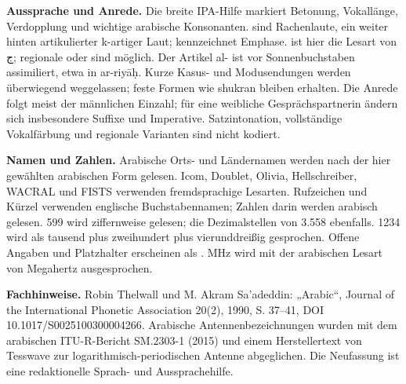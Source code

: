 \documentclass[a4paper,landscape,10pt]{article}
\newcommand{\ipa}[1]{{\ipafont[#1]}}
\begin{document}
\smallskip
\textbf{Aussprache und Anrede.} Die breite IPA-Hilfe markiert Betonung, Vokallänge, Verdopplung und wichtige
arabische Konsonanten. \ipa{ʕ, ħ} sind Rachenlaute, \ipa{q} ein weiter hinten artikulierter k-artiger Laut;
\ipa{ˤ} kennzeichnet Emphase. \ipa{dʒ} ist hier die Lesart von ج; regionale \ipa{ʒ} oder \ipa{ɡ} sind möglich.
Der Artikel al- ist vor Sonnenbuchstaben assimiliert, etwa in ar-riyāḥ.
Kurze Kasus- und Modusendungen werden überwiegend weggelassen; feste Formen wie shukran bleiben erhalten.
Die Anrede folgt meist der männlichen Einzahl; für eine weibliche Gesprächspartnerin ändern sich insbesondere
Suffixe und Imperative. Satzintonation, vollständige Vokalfärbung und regionale Varianten sind nicht kodiert.

\smallskip
\textbf{Namen und Zahlen.} Arabische Orts- und Ländernamen werden nach der hier gewählten arabischen Form gelesen.
Icom, Doublet, Olivia, Hellschreiber, WACRAL und FISTS verwenden fremdsprachige Lesarten.
Rufzeichen und Kürzel verwenden englische Buchstabennamen; Zahlen darin werden arabisch gelesen.
599 wird ziffernweise gelesen; die Dezimalstellen von 3.558 ebenfalls.
1234 wird als tausend plus zweihundert plus vierunddreißig gesprochen.
Offene Angaben und Platzhalter erscheinen als \ipa{…}. MHz wird mit der arabischen Lesart von Megahertz ausgesprochen.

\smallskip
\textbf{Fachhinweise.} Robin Thelwall und M. Akram Sa'adeddin: „Arabic“, Journal of the International
Phonetic Association 20(2), 1990, S. 37--41, DOI 10.1017/S0025100300004266.
Arabische Antennenbezeichnungen wurden mit dem arabischen
ITU-R-Bericht SM.2303-1 (2015) und einem Herstellertext von Tesswave zur logarithmisch-periodischen Antenne abgeglichen. Die Neufassung ist eine redaktionelle Sprach- und Aussprachehilfe.
\end{document}
